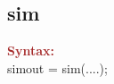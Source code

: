 \subsection{sim}

\noindent \textbf{\textcolor{brown}{Syntax:}}\\

\noindent simout = sim(....);\\





